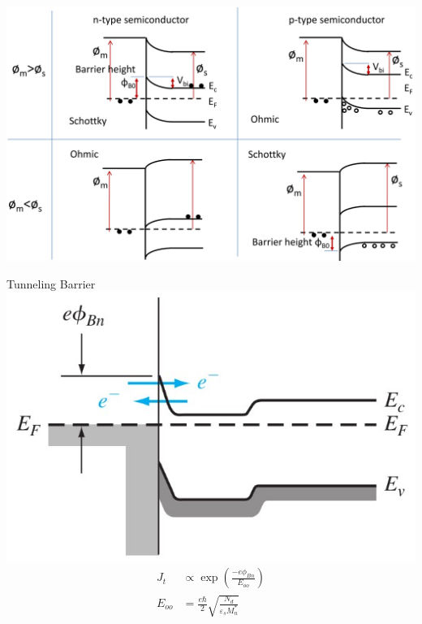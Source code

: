 \documentclass[a4paper, twocolumn]{article}
\begin{document}
        \includegraphics[width=\linewidth]{Types-of-semiconductor.jpg}
    
    \par Tunneling Barrier \\
        \includegraphics[width=0.8\linewidth]{Tunneling-barrier.jpg}
    \begin{equation*}
        \begin{aligned}
            J_t & \propto \exp \left( \frac{-e \phi_{Bn} }{E_{oo} }  \right) \\
            E_{oo} &= \frac{e \hbar}{2} \sqrt{\frac{N_d}{\varepsilon_s M_n^*} } 
        \end{aligned}
    \end{equation*}
    
\end{document}
